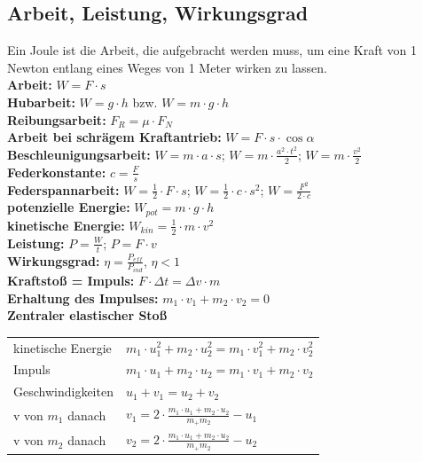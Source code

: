 \documentclass[eglish/german]{latex4ei/latex4ei_sheet}
\begin{document}
			\begin{sectionbox}
				\subsection{Arbeit, Leistung, Wirkungsgrad}
					Ein Joule ist die Arbeit, die aufgebracht werden muss, um eine Kraft von 1 Newton
					entlang eines Weges von 1 Meter wirken zu lassen.\\
					\textbf{Arbeit:} $W= F \cdot s$\\
					\textbf{Hubarbeit:} $W = g \cdot h$ bzw. $W = m \cdot g \cdot h$\\
					\textbf{Reibungsarbeit:} $F_R = \mu \cdot F_N$\\
					\textbf{Arbeit bei schrägem Kraftantrieb:} $W = F \cdot s \cdot \cos \alpha$\\
					\textbf{Beschleunigungsarbeit:} $W = m \cdot a \cdot s$; $W = m \cdot \frac{a^2 \cdot t^2}{2}$; $W = m \cdot \frac{v^2}{2}$\\
					\textbf{Federkonstante:} $c = \frac{F}{s}$\\
					\textbf{Federspannarbeit:} $W = \frac{1}{2}\cdot F \cdot s$; $W = \frac{1}{2}\cdot c \cdot s^2$; $W = \frac{F^2}{2 \cdot c}$\\
					\textbf{potenzielle Energie:} $W_{pot} = m \cdot g \cdot h$\\
					\textbf{kinetische Energie:} $W_{kin} = \frac{1}{2}\cdot m \cdot v^2$\\
					\textbf{Leistung:} $P = \frac{W}{t}$; $P = F \cdot v$\\
					\textbf{Wirkungsgrad:} $\eta = \frac{P_{eff}}{P_{ind}}$, $\eta < 1$\\
					\textbf{Kraftstoß = Impuls:} $F \cdot \Delta t = \Delta v \cdot m$\\
					\textbf{Erhaltung des Impulses:} $m_1 \cdot v_1 + m_2 \cdot v_2 = 0$\\
					
					\textbf{Zentraler elastischer Stoß}\\
					\begin{tabular}{ll}
						\midrule
						kinetische Energie & $m_1 \cdot u_1^2 + m_2 \cdot u_2^2 = m_1 \cdot v_1^2 + m_2 \cdot v_2^2$\\
						Impuls & $m_1 \cdot u_1 + m_2 \cdot u_2 = m_1 \cdot v_1 + m_2 \cdot v_2$\\
						Geschwindigkeiten & $u_1 +v_1 = u_2 + v_2$\\
						v von $m_1$ danach & $v_1 = 2 \cdot \frac{m_1 \cdot u_1 + m_2 \cdot u_2}{m_+ m_2}-u_1 $\\
						v von $m_2$ danach & $v_2 = 2 \cdot \frac{m_1 \cdot u_1 + m_2 \cdot u_2}{m_+ m_2}-u_2  $\\						
						\midrule
					\end{tabular}\\


\end{sectionbox}
\end{document}
